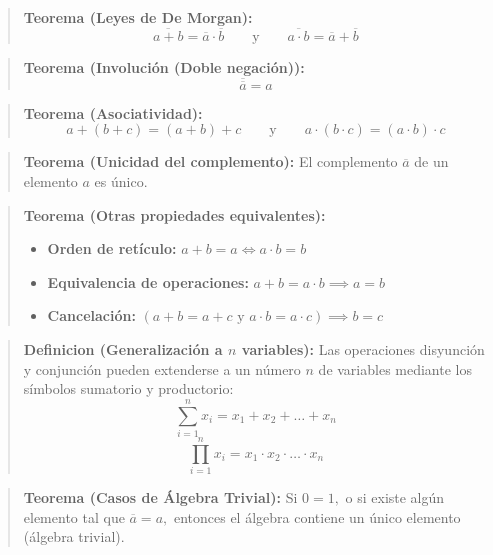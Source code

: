 \setcounter{tcb@cnt@teorema}{11}
\begin{quote}\textbf{Teorema (Leyes de De Morgan):}\label{morgan_eng}
\[ \overline{a + b} = \overline{a} \cdot \overline{b} \qquad \text{y} \qquad \overline{a \cdot b} = \overline{a} + \overline{b} \]
\end{quote}

\setcounter{tcb@cnt@teorema}{10}
\begin{quote}\textbf{Teorema (Involución (Doble negación)):}\label{involucion_eng}
\[ \overline{\overline{a}} = a \]
\end{quote}

\setcounter{tcb@cnt@teorema}{12}
\begin{quote}\textbf{Teorema (Asociatividad):}\label{asociatividad_eng}
\[ a + (b + c) = (a + b) + c \qquad \text{y} \qquad a \cdot (b \cdot c) = (a \cdot b) \cdot c \]
\end{quote}

\setcounter{tcb@cnt@teorema}{9}
\begin{quote}\textbf{Teorema (Unicidad del complemento):}\label{unic_comp_eng}
El complemento $\overline{a}$ de un elemento $a$ es único.
\end{quote}

\setcounter{tcb@cnt@teorema}{6}
\begin{quote}\textbf{Teorema (Otras propiedades equivalentes):}\label{otras_prop_eng}
\begin{itemize}
    \item \textbf{Orden de retículo:} $a + b = a \iff a \cdot b = b$
    \item \textbf{Equivalencia de operaciones:} $a + b = a \cdot b \implies a = b$
    \item \textbf{Cancelación:} $(a + b = a + c \text{ y } a \cdot b = a \cdot c) \implies b = c$
\end{itemize}
\end{quote}

\setcounter{tcb@cnt@definicion}{0}
\begin{quote}\textbf{Definicion (Generalización a $n$ variables):}\label{gen_n_vars_eng}
Las operaciones disyunción y conjunción pueden extenderse a un número $n$ de variables mediante los símbolos sumatorio y productorio:
\[ \sum_{i=1}^{n} x_i = x_1 + x_2 + \dots + x_n \]
\[ \prod_{i=1}^{n} x_i = x_1 \cdot x_2 \cdot \dots \cdot x_n \]
\end{quote}

\setcounter{tcb@cnt@teorema}{3}
\begin{quote}\textbf{Teorema (Casos de Álgebra Trivial):}\label{trivial_eng}
Si $0 = 1,$ o si existe algún elemento tal que $\overline{a} = a,$ entonces el álgebra contiene un único elemento (álgebra trivial).
\end{quote}


